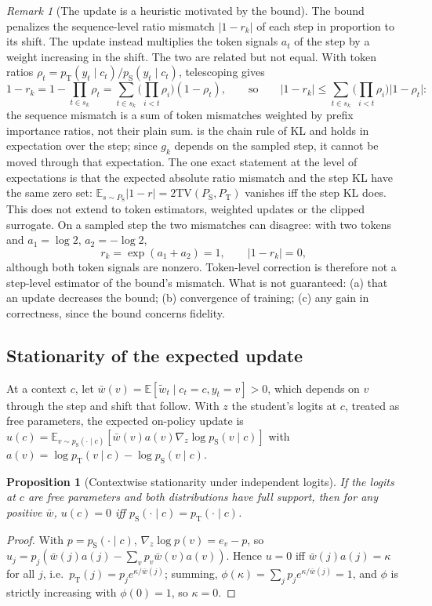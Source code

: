 \documentclass[11pt]{article}
\newtheorem{proposition}{Proposition}
\theoremstyle{definition}
\theoremstyle{remark}
\newtheorem{remark}{Remark}
\newcommand{\PT}{P_{\mathrm{T}}}
\newcommand{\PS}{P_{\mathrm{S}}}
\newcommand{\pT}{p_{\mathrm{T}}}
\newcommand{\pS}{p_{\mathrm{S}}}
\newcommand{\TV}{\mathrm{TV}}
\newcommand{\E}{\mathbb{E}}
\begin{document}
\begin{remark}[The update is a heuristic motivated by the bound]
\label{rem:surrogate}
The bound penalizes the sequence-level ratio mismatch $\lvert1-r_k\rvert$ of each step in proportion to its shift. The update instead multiplies the token signals $a_t$ of the step by a weight increasing in the shift. The two are related but not equal. With token ratios $\rho_t=\pT(y_t\mid c_t)/\pS(y_t\mid c_t)$, telescoping gives
\[
1-r_k=1-\prod_{t\in s_k}\rho_t=\sum_{t\in s_k}\Big(\prod_{i<t}\rho_i\Big)(1-\rho_t),
\qquad\text{so}\qquad
\lvert1-r_k\rvert\le\sum_{t\in s_k}\Big(\prod_{i<t}\rho_i\Big)\lvert1-\rho_t\rvert:
\]
the sequence mismatch is a sum of token mismatches weighted by prefix importance ratios, not their plain sum.  is the chain rule of KL and holds in expectation over the step; since $g_k$ depends on the sampled step, it cannot be moved through that expectation. The one exact statement at the level of expectations is that the expected absolute ratio mismatch and the step KL have the same zero set: $\E_{s\sim\PS}\lvert1-r\rvert=2\TV(\PS,\PT)$ vanishes iff the step KL does. This does not extend to token estimators, weighted updates or the clipped surrogate. On a sampled step the two mismatches can disagree: with two tokens and $a_1=\log2$, $a_2=-\log2$,
\[
r_k=\exp(a_1+a_2)=1,\qquad\lvert1-r_k\rvert=0,
\]
although both token signals are nonzero. Token-level correction is therefore not a step-level estimator of the bound's mismatch. What is not guaranteed: (a) that an update decreases the bound; (b) convergence of training; (c) any gain in correctness, since the bound concerns fidelity.
\end{remark}

\subsection{Stationarity of the expected update}

At a context $c$, let $\bar w(v)=\E[\tilde w_t\mid c_t=c,y_t=v]>0$, which depends on $v$ through the step and shift that follow. With $z$ the student's logits at $c$, treated as free parameters, the expected on-policy update is $u(c)=\E_{v\sim\pS(\cdot\mid c)}[\bar w(v)a(v)\nabla_z\log\pS(v\mid c)]$ with $a(v)=\log\pT(v\mid c)-\log\pS(v\mid c)$.

\begin{proposition}[Contextwise stationarity under independent logits]
\label{prop:stationary}
If the logits at $c$ are free parameters and both distributions have full support, then for any positive $\bar w$, $u(c)=0$ iff $\pS(\cdot\mid c)=\pT(\cdot\mid c)$.
\end{proposition}
\begin{proof}
With $p=\pS(\cdot\mid c)$, $\nabla_z\log p(v)=e_v-p$, so $u_j=p_j(\bar w(j)a(j)-\sum_vp_v\bar w(v)a(v))$. Hence $u=0$ iff $\bar w(j)a(j)=\kappa$ for all $j$, i.e.\ $\pT(j)=p_j e^{\kappa/\bar w(j)}$; summing, $\phi(\kappa)=\sum_jp_je^{\kappa/\bar w(j)}=1$, and $\phi$ is strictly increasing with $\phi(0)=1$, so $\kappa=0$.
\end{proof}
\end{document}
